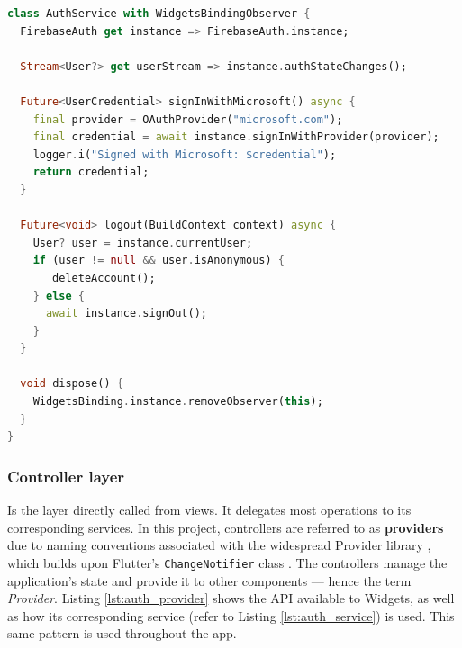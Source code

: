 \documentclass[
  digital,     %
  oneside,     %
  nosansbold,  %
  nocolorbold, %
  lof,         %
  lot,         %
]{fithesis4}
\begin{document}
\begin{listing}
    
\begin{lstlisting}[language=Dart, caption={Service layer example on Firebase AuthService class}, label={lst:auth_service}, floatplacement=H, showstringspaces=false]
class AuthService with WidgetsBindingObserver {
  FirebaseAuth get instance => FirebaseAuth.instance;

  Stream<User?> get userStream => instance.authStateChanges();

  Future<UserCredential> signInWithMicrosoft() async {
    final provider = OAuthProvider("microsoft.com");
    final credential = await instance.signInWithProvider(provider);
    logger.i("Signed with Microsoft: $credential");
    return credential;
  }

  Future<void> logout(BuildContext context) async {
    User? user = instance.currentUser;
    if (user != null && user.isAnonymous) {
      _deleteAccount();
    } else {
      await instance.signOut();
    }
  }

  void dispose() {
    WidgetsBinding.instance.removeObserver(this);
  }
}
\end{lstlisting}
\end{listing}


\subsubsection{Controller layer}
Is the layer directly called from views. It delegates most operations to its corresponding services. In this project, controllers are referred to as \textbf{providers} due to naming conventions associated with the widespread Provider library \cite{providerPackage}, which builds upon Flutter's \texttt{ChangeNotifier} class \cite{flutterChangeNotifier}.  
The controllers manage the application's state and provide it to other components --- hence the term \textit{Provider}. Listing \ref{lst:auth_provider} shows the \gls{API} available to Widgets, as well as how its corresponding service (refer to Listing \ref{lst:auth_service}) is used. This same pattern is used throughout the app.
\end{document}
